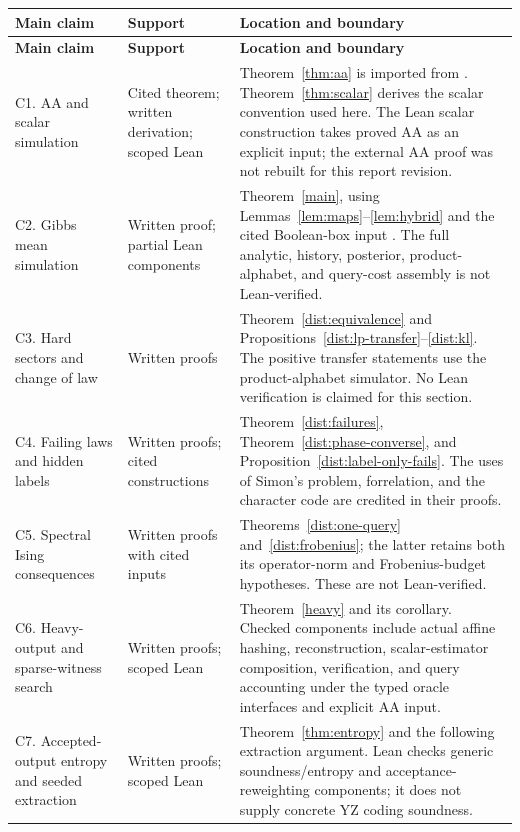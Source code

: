 \documentclass[11pt]{article}
\theoremstyle{definition}\newtheorem{definition}[theorem]{Definition}
\theoremstyle{remark}\newtheorem{remark}[theorem]{Remark}
\begin{document}
\begingroup\small
\begin{longtable}{@{}>{\raggedright\arraybackslash}p{}>{\raggedright\arraybackslash}p{}>{\raggedright\arraybackslash}p{}@{}}
\toprule
\textbf{Main claim} & \textbf{Support} & \textbf{Location and boundary}\\
\midrule
\endfirsthead
\toprule
\textbf{Main claim} & \textbf{Support} & \textbf{Location and boundary}\\
\midrule
\endhead
\bottomrule
\endfoot
C1. AA and scalar simulation & Cited theorem; written derivation; scoped Lean & Theorem~\ref{thm:aa} is imported from \cite{Tur26,BDST26}. Theorem~\ref{thm:scalar} derives the scalar convention used here. The Lean scalar construction takes proved AA as an explicit input; the external AA proof was not rebuilt for this report revision.\\[5pt]
C2. Gibbs mean simulation & Written proof; partial Lean components & Theorem~\ref{main}, using Lemmas~\ref{lem:maps}--\ref{lem:hybrid} and the cited Boolean-box input \cite{HMP26}. The full analytic, history, posterior, product-alphabet, and query-cost assembly is not Lean-verified.\\[5pt]
C3. Hard sectors and change of law & Written proofs & Theorem~\ref{dist:equivalence} and Propositions~\ref{dist:lp-transfer}--\ref{dist:kl}. The positive transfer statements use the product-alphabet simulator. No Lean verification is claimed for this section.\\[5pt]
C4. Failing laws and hidden labels & Written proofs; cited constructions & Theorem~\ref{dist:failures}, Theorem~\ref{dist:phase-converse}, and Proposition~\ref{dist:label-only-fails}. The uses of Simon's problem, forrelation, and the character code are credited in their proofs.\\[5pt]
C5. Spectral Ising consequences & Written proofs with cited inputs & Theorems~\ref{dist:one-query} and~\ref{dist:frobenius}; the latter retains both its operator-norm and Frobenius-budget hypotheses. These are not Lean-verified.\\[5pt]
C6. Heavy-output and sparse-witness search & Written proofs; scoped Lean & Theorem~\ref{heavy} and its corollary. Checked components include actual affine hashing, reconstruction, scalar-estimator composition, verification, and query accounting under the typed oracle interfaces and explicit AA input.\\[5pt]
C7. Accepted-output entropy and seeded extraction & Written proofs; scoped Lean & Theorem~\ref{thm:entropy} and the following extraction argument. Lean checks generic soundness/entropy and acceptance-reweighting components; it does not supply concrete YZ coding soundness.\\[5pt]

\end{longtable}
\end{document}
